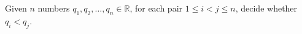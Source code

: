 \begin{problem}[Sorting]
	Given \(n\) numbers \(q_1, q_2, \ldots, q_n \in \mathbb{R}\),
	for each pair \(1 \leq i < j \leq n\),
	decide whether \(q_i < q_j\).
\end{problem}
